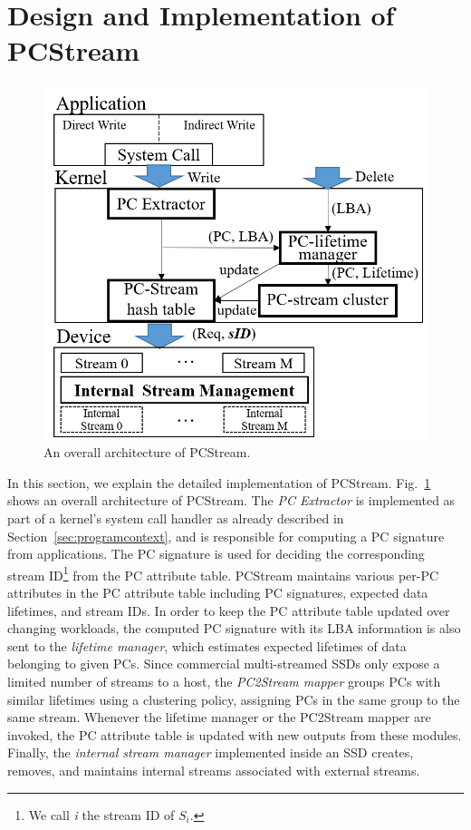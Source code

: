 \vspace{-10pt}
\section{Design and Implementation of \textsf{PCStream}}
\vspace{-5pt}

\begin{figure}[t]
	\centering
	\includegraphics[width=0.7\linewidth]{figure/overview}
	\vspace{-9pt}
	\caption{An overall architecture of \textsf{\small PCStream}.}
	\label{fig:architecture}
	\vspace{-15pt}
\end{figure}


In this section, we explain the detailed implementation of \textsf{\small
PCStream}.  Fig.~\ref{fig:architecture} shows an overall architecture of
\textsf{\small PCStream}. The \textit{PC Extractor} is implemented as
part of a kernel's system call handler as already described in
Section~\ref{sec:programcontext}, and is responsible for computing a PC signature
from applications.  
{\color{blue}
The PC signature is used for deciding the corresponding stream ID\footnote{
We call {\it i} the stream ID of $S_i$.} from the PC attribute table.
\textsf{\small PCStream} maintains various per-PC attributes in the PC attribute table
including PC signatures, expected data lifetimes, and stream IDs.
In order to keep the PC attribute table updated over changing workloads,
the computed PC signature with its LBA information is also sent to the 
{\it lifetime manager}, which 
}
estimates expected lifetimes of data belonging to given PCs.
Since commercial multi-streamed SSDs only expose a limited number of streams to a host, 
the \textit{PC2Stream mapper} groups PCs with similar lifetimes using a clustering
policy, assigning PCs in the same group to the same stream.  
{\color{blue}
Whenever the lifetime manager or the PC2Stream mapper are invoked,
the PC attribute table is updated with new outputs from these modules.
}
Finally, the
\textit{internal stream manager} implemented inside an SSD creates, removes,
and maintains internal streams associated with external streams.

